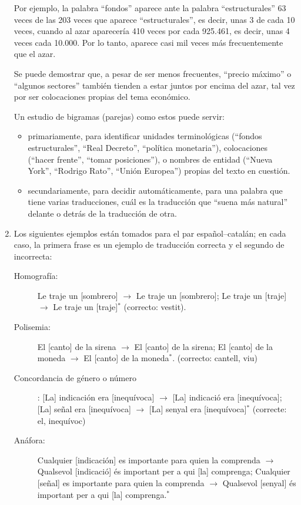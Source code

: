 \begin{enumerate}
Por ejemplo, la palabra ``fondos'' aparece ante la palabra ``estructurales'' 63 veces de las 203 veces que aparece ``estructurales'', es decir, unas 3 de cada 10 veces, cuando al azar aparecería 410 veces por cada 925.461, es decir, unas 4 veces cada 10.000. Por lo tanto, aparece casi mil veces más frecuentemente que el azar. 

Se puede demostrar que, a pesar de ser menos frecuentes, ``precio máximo'' o ``algunos sectores'' también tienden a estar juntos por encima del azar, tal vez por ser colocaciones propias del tema económico. 

Un estudio de bigramas (parejas) como estos puede servir: 

\begin{itemize} \item primariamente, para identificar unidades terminológicas (``fondos estructurales'', ``Real Decreto'', ``política monetaria''), colocaciones (``hacer frente'', ``tomar posiciones''), o nombres de entidad (``Nueva York'', ``Rodrigo Rato'', ``Unión Europea'') propias del texto en cuestión. 

\item secundariamente, para decidir automáticamente, para una palabra que tiene varias traducciones, cuál es la traducción que ``suena más natural'' delante o detrás de la traducción de otra. \end{itemize} 

\item Los siguientes ejemplos están tomados para el par
  español--catalán; en cada caso, la primera frase es un ejemplo de
  traducción correcta y el segundo de incorrecta: 
\begin{description} \item[Homografía:] Le traje un [sombrero] $\rightarrow$ Le traje un [sombrero]; Le traje un [traje] $\rightarrow$ Le traje un [traje]$^*$ (correcto: vestit). \item[Polisemia:] El [canto] de la sirena $\rightarrow$ El [canto] de la sirena; El [canto] de la moneda $\rightarrow$ El [canto] de la moneda$^*$. (correcto: cantell, viu) \item[Concordancia de género o número]: [La] indicación era [inequívoca] $\rightarrow$ [La] indicació era [inequívoca]; [La] señal era [inequívoca] $\rightarrow$ [La] senyal era [inequívoca]$^*$ (correcte: el, inequívoc) \item[Anáfora:] Cualquier [indicación] es importante para quien la comprenda $\rightarrow$ Qualsevol [indicació] és important per a qui [la] comprenga; Cualquier [señal] es importante para quien la comprenda $\rightarrow$ Qualsevol [senyal] és important per a qui [la] comprenga.$^*$ \end{description} 


\end{enumerate}
